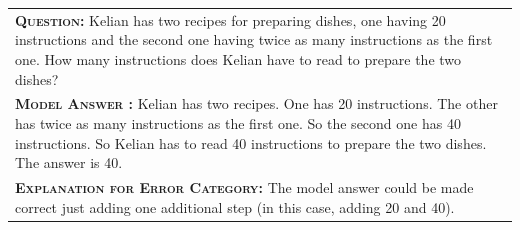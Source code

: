 \begin{table}[h]
\begin{tabular}{p{\linewidth}}
        \midrule
        \vspace{-2mm}
        \textbf{\textsc{Question:}} Kelian has two recipes for preparing dishes, one having 20 instructions and the second one having twice as many instructions as the first one. How many instructions does Kelian have to read to prepare the two dishes? \\
        \vspace{-1mm}
        \textbf{\textsc{Model Answer \color{blue}{(incorrect; one step missing error)}:}} Kelian has two recipes. One has 20 instructions. The other has twice as many instructions as the first one. So the second one has 40 instructions. So Kelian has to read 40 instructions to prepare the two dishes. The answer is 40.   \color{blue}{\xmark} \\
        \vspace{-1mm}
        \textbf{\textsc{Explanation for Error Category:}} The model answer could be made correct just adding one additional step (in this case, adding 20 and 40). \\
        \bottomrule
    \end{tabular}
    \label{tab:appendix-gsm8k-incorrect-examples}
\end{table}
\endgroup